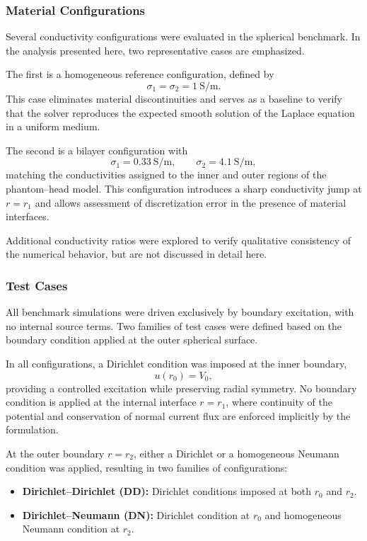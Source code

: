 \subsubsection{Material Configurations}

Several conductivity configurations were evaluated in the spherical benchmark. In the analysis presented here, two representative cases are emphasized.

The first is a homogeneous reference configuration, defined by
\[
\sigma_1 = \sigma_2 = 1~\mathrm{S/m}.
\]
This case eliminates material discontinuities and serves as a baseline to verify that the solver reproduces the expected smooth solution of the Laplace equation in a uniform medium.

The second is a bilayer configuration with
\[
\sigma_1 = 0.33~\mathrm{S/m}, \qquad \sigma_2 = 4.1~\mathrm{S/m},
\]
matching the conductivities assigned to the inner and outer regions of the phantom--head model. This configuration introduces a sharp conductivity jump at $r = r_1$ and allows assessment of discretization error in the presence of material interfaces.

Additional conductivity ratios were explored to verify qualitative consistency of the numerical behavior, but are not discussed in detail here.

\subsubsection{Test Cases}

All benchmark simulations were driven exclusively by boundary excitation, with no internal source terms. Two families of test cases were defined based on the boundary condition applied at the outer spherical surface.

In all configurations, a Dirichlet condition was imposed at the inner boundary,
\[
u(r_0) = V_0,
\]
providing a controlled excitation while preserving radial symmetry. No boundary condition is applied at the internal interface $r = r_1$, where continuity of the potential and conservation of normal current flux are enforced implicitly by the formulation.

At the outer boundary $r = r_2$, either a Dirichlet or a homogeneous Neumann condition was applied, resulting in two families of configurations:
\begin{itemize}
    \item \textbf{Dirichlet--Dirichlet (DD):} Dirichlet conditions imposed at both $r_0$ and $r_2$.
    \item \textbf{Dirichlet--Neumann (DN):} Dirichlet condition at $r_0$ and homogeneous Neumann condition at $r_2$.
\end{itemize}


